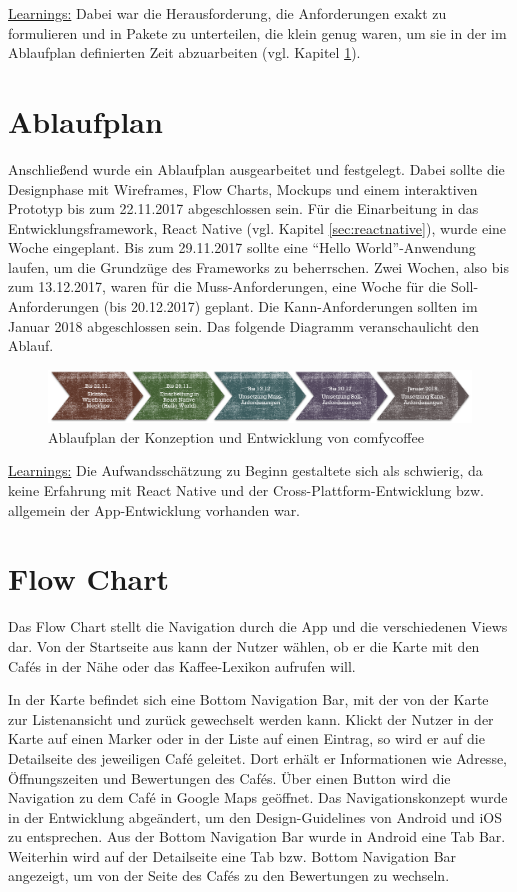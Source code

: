 \underline{Learnings:}
Dabei war die Herausforderung, die Anforderungen exakt zu formulieren und in Pakete zu unterteilen, die klein genug waren, um sie in der im Ablaufplan definierten Zeit abzuarbeiten (vgl. Kapitel \ref{sec:ablaufplan}).

\section{Ablaufplan}
\label{sec:ablaufplan}
Anschließend wurde ein Ablaufplan ausgearbeitet und festgelegt. Dabei sollte die Designphase mit Wireframes, Flow Charts, Mockups und einem interaktiven Prototyp bis zum 22.11.2017 abgeschlossen sein. Für die Einarbeitung in das Entwicklungsframework, React Native (vgl. Kapitel \ref{sec:reactnative}), wurde eine Woche eingeplant. Bis zum 29.11.2017 sollte eine ``Hello World''-Anwendung laufen, um die Grundzüge des Frameworks zu beherrschen. Zwei Wochen, also bis zum 13.12.2017, waren für die Muss-Anforderungen, eine Woche für die Soll-Anforderungen (bis 20.12.2017) geplant. Die Kann-Anforderungen sollten im Januar 2018 abgeschlossen sein. Das folgende Diagramm veranschaulicht den Ablauf.

\begin{figure}[H]
    \centering
		\includegraphics[width=\textwidth]{Bilder/ablaufplan.png}
		\caption{Ablaufplan der Konzeption und Entwicklung von comfycoffee}
\end{figure}

\underline{Learnings:}
Die Aufwandsschätzung zu Beginn gestaltete sich als schwierig, da keine Erfahrung mit React Native und der Cross-Plattform-Entwicklung bzw. allgemein der App-Entwicklung vorhanden war.

\section{Flow Chart}
Das Flow Chart stellt die Navigation durch die App und die verschiedenen Views dar. Von der Startseite aus kann der Nutzer wählen, ob er die Karte mit den Cafés in der Nähe oder das Kaffee-Lexikon aufrufen will.

In der Karte befindet sich eine Bottom Navigation Bar, mit der von der Karte zur Listenansicht und zurück gewechselt werden kann. Klickt der Nutzer in der Karte auf einen Marker oder in der Liste auf einen Eintrag, so wird er auf die Detailseite des jeweiligen Café geleitet. Dort erhält er Informationen wie Adresse, Öffnungszeiten und Bewertungen des Cafés. Über einen Button wird die Navigation zu dem Café in Google Maps geöffnet. Das Navigationskonzept wurde in der Entwicklung abgeändert, um den Design-Guidelines von Android und iOS zu entsprechen. Aus der Bottom Navigation Bar wurde in Android eine Tab Bar. Weiterhin wird auf der Detailseite eine Tab bzw. Bottom Navigation Bar angezeigt, um von der Seite des Cafés zu den Bewertungen zu wechseln.

